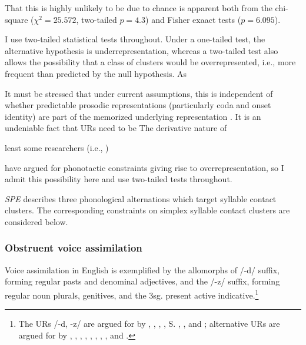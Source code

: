 That this is highly unlikely to be due to chance is apparent both from the chi-square ($\chi^2 = 25.572$, two-tailed $p = 4.3$) and Fisher exaact tests ($p =  6.095$). 

I use two-tailed statistical tests throughout. 
Under a one-tailed test, the alternative hypothesis is underrepresentation, whereas a two-tailed test also allows the possibility that a class of clusters would be overrepresented, i.e., more frequent than predicted by the null hypothesis. As 

\citet{Pierrehumbert1994}

It must be stressed that under current assumptions, this is independent of whether predictable prosodic representations (particularly coda and onset identity) are part of the memorized underlying representation \citep[e.g.,][]{Vaux2003}.
It is an undeniable fact that URs need to be 
The derivative nature of 
\citet{Ito1989a,Noske1992}

least some researchers (i.e., \citealt{Mester1988}) 

 \citep[e.g.,]{Brown2010} have argued for phonotactic constraints giving rise to overrepresentation, so I admit this possibility here and use two-tailed tests throughout. 





\emph{SPE} describes three phonological alternations which target syllable contact clusters. The corresponding constraints on simplex syllable contact clusters are considered below.

\subsubsection{Obstruent voice assimilation}

Voice assimilation in English is exemplified by the allomorphs of /-d/ suffix, forming regular pasts and denominal adjectives, and the /-z/ suffix, forming regular noun plurals, genitives, and the 3sg. present active indicative.\footnote{The URs /-d, -z/ are argued for by \citet[][282]{Hockett1958}, \citet[][210]{SPE}, \citet{Basboll1972}, \citet{Shibatani1972}, S. \citet[][]{Anderson1973a}, \citet[][102]{Pinker1988}, and \citet[][284f.]{Bakovic2005b}; alternative URs are argued for by \citet[][210f.]{LANGUAGE}, \citet[][426]{Nida1948}, \citet{Luelsdorff1969}, \citet{Lightner1970}, \citet{Hoard1971}, \citet[]{Miner1975}, \citet{Zwicky1975}, \citet{Kiparsky1985}, and \citet[][135]{Borowsky1986}.}

